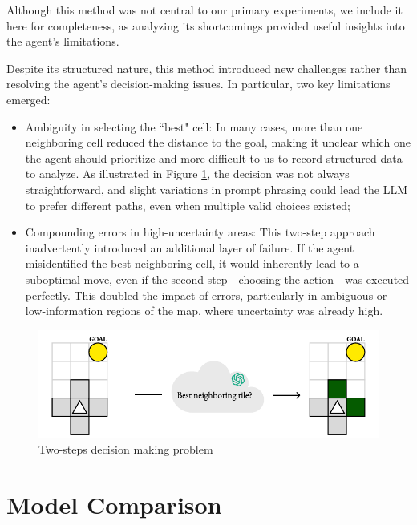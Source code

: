 Although this method was not central to our primary experiments, we include it here
for completeness, as analyzing its shortcomings provided useful insights into
the agent's limitations.

Despite its structured nature, this method introduced new challenges rather than
resolving the agent's decision-making issues. In particular, two key limitations
emerged:
\begin{itemize}
  \item Ambiguity in selecting the ``best" cell: In many cases, more than one
    neighboring cell reduced the distance to the goal, making it unclear which one
    the agent should prioritize and more difficult to us to record structured data
    to analyze. As illustrated in Figure \ref{fig:extra2}, the decision was not always
    straightforward, and slight variations in prompt phrasing could lead the LLM
    to prefer different paths, even when multiple valid choices existed;

  \item Compounding errors in high-uncertainty areas: This two-step approach
    inadvertently introduced an additional layer of failure. If the agent misidentified
    the best neighboring cell, it would inherently lead to a suboptimal move, even
    if the second step—choosing the action—was executed perfectly. This doubled
    the impact of errors, particularly in ambiguous or low-information regions of
    the map, where uncertainty was already high.
\end{itemize}

\vspace{7mm}
\begin{figure}[h!]
  \centering
  \includegraphics[width=.66\textwidth]{images/results_discussion/extra2.pdf}
  \caption{Two-steps decision making problem}
  \label{fig:extra2}
\end{figure}
\vspace{7mm}

\section{Model Comparison}
\label{sec:model_comparison}


